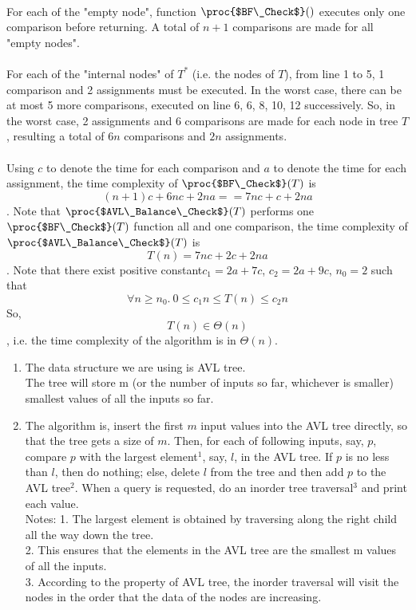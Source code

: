 \documentclass[11pt, answers]{exam}
\theoremstyle{plain}
\theoremstyle{definition}
\begin{document}
\begin{questions}
\begin{solution}
\\
For each of the "empty node", function $\proc{$BF\_Check$}()$ executes only one comparison before returning. A total of $n+1$ comparisons are made for all "empty nodes".\\
\\
For each of the "internal nodes" of $T^*$ (i.e. the nodes of $T$), from line 1 to 5, 1 comparison and 2 assignments must be executed. In the worst case, there can be at most 5 more comparisons, executed on line 6, 6, 8, 10, 12 successively. So, in the worst case, 2 assignments and 6 comparisons are made for each node in tree $T$, resulting a total of $6n$ comparisons and $2n$ assignments.\\
\\
Using $c$ to denote the time for each comparison and $a$ to denote the time for each assignment, the time complexity of $\proc{$BF\_Check$}(T)$ is $$(n+1)c+6nc+2na == 7nc+c+2na$$. Note that $\proc{$AVL\_Balance\_Check$}(T)$ performs one $\proc{$BF\_Check$}(T)$ function all and one comparison, the time complexity of $\proc{$AVL\_Balance\_Check$}(T)$ is $$T(n) = 7nc+2c+2na$$.
Note that there exist positive constant$c_1=2a+7c$, $c_2=2a+9c$, $n_0=2$ such that $$\forall n\geq n_0 .\  0\leq c_1n \leq T(n) \leq c_2n$$
So, $$T(n) \in \Theta(n)$$, i.e. the time complexity of the algorithm is in $\Theta(n)$.
\end{solution}

\question
\begin{solution}
\begin{enumerate}
\item The data structure we are using is AVL tree. \\
The tree will store m (or the number of inputs so far, whichever is smaller) smallest values of all the inputs so far.

\item The algorithm is, insert the first $m$ input values into the AVL tree directly, so that the tree gets a size of $m$. Then, for each of following inputs, say, $p$, compare $p$ with the largest element$^1$, say, $l$, in the AVL tree. If $p$ is no less than $l$, then do nothing; else, delete $l$ from the tree and then add $p$ to the AVL tree$^2$. When a query is requested, do an inorder tree traversal$^3$ and print each value.\\
Notes: 
1. The largest element is obtained by traversing along the right child all the way down the tree.\\
2. This ensures that the elements in the AVL tree are the smallest m values of all the inputs. \\
3.  According to the property of AVL tree, the inorder traversal will visit the nodes in the order that the data of the nodes are increasing.\\


\end{enumerate}
\end{solution}
\end{questions}
\end{document}
